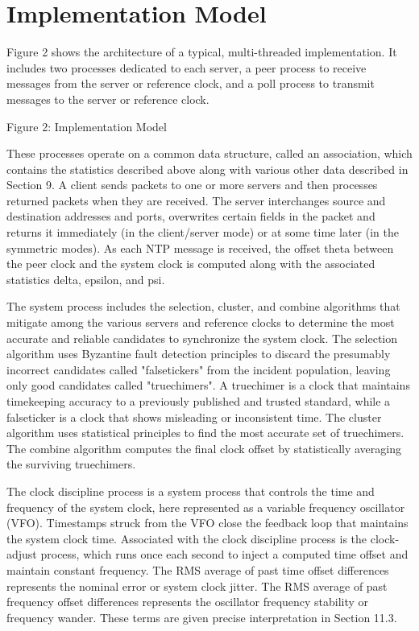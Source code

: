 \chapter{Implementation Model}

Figure 2 shows the architecture of a typical, multi-threaded
implementation. It includes two processes dedicated to each server,
a peer process to receive messages from the server or reference
clock, and a poll process to transmit messages to the server or
reference clock.


Figure 2: Implementation Model

These processes operate on a common data structure, called an
association, which contains the statistics described above along with
various other data described in Section 9. A client sends packets to
one or more servers and then processes returned packets when they are
received. The server interchanges source and destination addresses
and ports, overwrites certain fields in the packet and returns it
immediately (in the client/server mode) or at some time later (in the
symmetric modes). As each NTP message is received, the offset theta
between the peer clock and the system clock is computed along with
the associated statistics delta, epsilon, and psi.

The system process includes the selection, cluster, and combine
algorithms that mitigate among the various servers and reference
clocks to determine the most accurate and reliable candidates to
synchronize the system clock. The selection algorithm uses Byzantine
fault detection principles to discard the presumably incorrect
candidates called "falsetickers" from the incident population,
leaving only good candidates called "truechimers". A truechimer is a
clock that maintains timekeeping accuracy to a previously published
and trusted standard, while a falseticker is a clock that shows
misleading or inconsistent time. The cluster algorithm uses
statistical principles to find the most accurate set of truechimers.
The combine algorithm computes the final clock offset by
statistically averaging the surviving truechimers.

The clock discipline process is a system process that controls the
time and frequency of the system clock, here represented as a
variable frequency oscillator (VFO). Timestamps struck from the VFO
close the feedback loop that maintains the system clock time.
Associated with the clock discipline process is the clock-adjust
process, which runs once each second to inject a computed time offset
and maintain constant frequency. The RMS average of past time offset
differences represents the nominal error or system clock jitter. The
RMS average of past frequency offset differences represents the
oscillator frequency stability or frequency wander. These terms are
given precise interpretation in Section 11.3.

